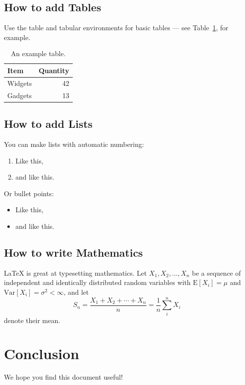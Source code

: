 \documentclass{article}
\begin{document}
\subsection{How to add Tables}

Use the table and tabular environments for basic tables --- see Table~\ref{tab:widgets}, for example.

\begin{table}[h]
\centering
\begin{tabular}{l|r}
Item & Quantity \\\hline
Widgets & 42 \\
Gadgets & 13
\end{tabular}
\caption{An example table.}
\label{tab:widgets}
\end{table}

\subsection{How to add Lists}

You can make lists with automatic numbering:

\begin{enumerate}
\item Like this,
\item and like this.
\end{enumerate}

Or bullet points:
\begin{itemize}
\item Like this,
\item and like this.
\end{itemize}

\subsection{How to write Mathematics}

\LaTeX{} is great at typesetting mathematics. Let $X_1, X_2, \ldots, X_n$ be a sequence of independent and identically distributed random variables with $\text{E}[X_i] = \mu$ and $\text{Var}[X_i] = \sigma^2 < \infty$, and let
\[S_n = \frac{X_1 + X_2 + \cdots + X_n}{n}
      = \frac{1}{n}\sum_{i}^{n} X_i\]
denote their mean.

\section{Conclusion}

We hope you find this document useful!
\end{document}
